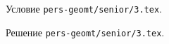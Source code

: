 \problem
Условие \texttt{pers-geomt/senior/3.tex}.

\solution Решение \texttt{pers-geomt/senior/3.tex}.
\endproblem
